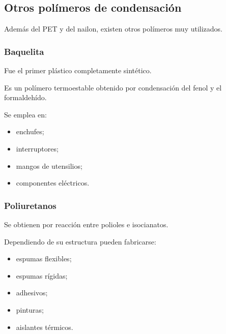
\subsection{Otros polímeros de condensación}

Además del PET y del nailon, existen otros polímeros muy utilizados.

\subsubsection*{Baquelita}

Fue el primer plástico completamente sintético.

Es un polímero termoestable obtenido por condensación del fenol y el formaldehído.

Se emplea en:

\begin{itemize}

\item enchufes;

\item interruptores;

\item mangos de utensilios;

\item componentes eléctricos.

\end{itemize}

\vspace{0.3cm}

\subsubsection*{Poliuretanos}

Se obtienen por reacción entre polioles e isocianatos.

Dependiendo de su estructura pueden fabricarse:

\begin{itemize}

\item espumas flexibles;

\item espumas rígidas;

\item adhesivos;

\item pinturas;

\item aislantes térmicos.

\end{itemize}

